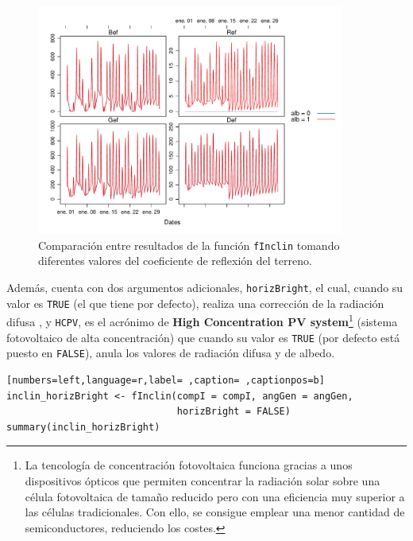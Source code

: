 \begin{itemize}
\begin{figure}[!htb]
\centering
\includegraphics[width=0.9\textwidth]{figuras/codigo-finclinalb.pdf}
\caption{Comparación entre resultados de la función \texttt{fInclin} tomando diferentes valores del coeficiente de reflexión del terreno.}
\end{figure}
Además, cuenta con dos argumentos adicionales, \texttt{horizBright}, el cual, cuando su valor es \texttt{TRUE} (el que tiene por defecto), realiza una corrección de la radiación difusa \cite{REINDL19909}, y \texttt{HCPV}, es el acrónimo de \textbf{High Concentration PV system}\footnote{La tencología de concentración fotovoltaica funciona gracias a unos dispositivos ópticos que permiten concentrar la radiación solar sobre una célula fotovoltaica de tamaño reducido pero con una eficiencia muy superior a las células tradicionales. Con ello, se consigue emplear una menor cantidad de semiconductores, reduciendo los costes.} (sistema fotovoltaico de alta concentración) que cuando su valor es \texttt{TRUE} (por defecto está puesto en \texttt{FALSE}), anula los valores de radiación difusa y de albedo.
\begin{lstlisting}[numbers=left,language=r,label= ,caption= ,captionpos=b]
inclin_horizBright <- fInclin(compI = compI, angGen = angGen,
                              horizBright = FALSE)
summary(inclin_horizBright)
\end{lstlisting}


\end{itemize}
